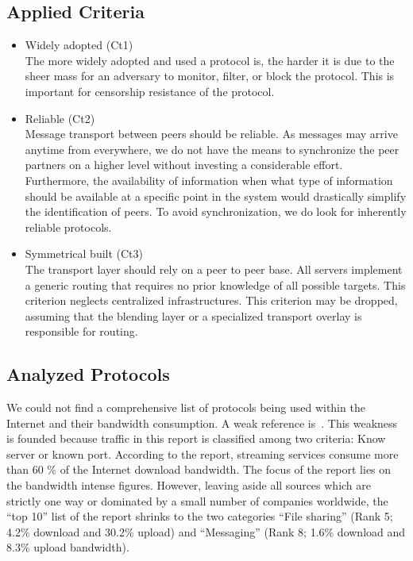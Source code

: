 \subsection{Applied Criteria\label{sec:transportCriteria}}
\begin{itemize}
	\item Widely adopted (Ct1)\\
	The more widely adopted and used a protocol is, the harder it is due to the sheer mass for an adversary to monitor, filter, or block the protocol. This is important for censorship resistance of the protocol. 
	\item Reliable (Ct2)\\
	Message transport between peers should be reliable. As messages may arrive anytime from everywhere, we do not have the means to synchronize the peer partners on a higher level without investing a considerable effort. Furthermore, the availability of information when what type of information should be available at a specific point in the system would drastically simplify the identification of peers. To avoid synchronization, we do look for inherently reliable protocols.
	\item Symmetrical built (Ct3)\\
	The transport layer should rely on a peer to peer base. All servers implement a generic routing that requires no prior knowledge of all possible targets. This criterion neglects centralized infrastructures. This criterion may be dropped, assuming that the blending layer or a specialized transport overlay is responsible for routing.
\end{itemize}

\subsection{Analyzed Protocols}
We could not find a comprehensive list of protocols being used within the Internet and their bandwidth consumption. A weak reference is~\cite{zhou2011examining}. This weakness is founded because traffic in this report is classified among two criteria: Know server or known port. According to the report, streaming services consume more than 60 \% of the Internet download bandwidth. The focus of the report lies on the bandwidth intense figures. However, leaving aside all sources which are strictly one way or dominated by a small number of companies worldwide, the ``top 10'' list of the report shrinks to the two categories ``File sharing'' (Rank 5; 4.2\% download and 30.2\% upload) and ``Messaging'' (Rank 8; 1.6\% download and 8.3\% upload bandwidth). 

